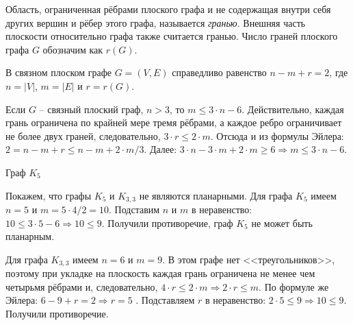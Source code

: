 Область, ограниченная рёбрами плоского графа и не содержащая внутри себя других 
вершин и рёбер этого графа, называется \emph{гранью}. Внешняя часть плоскости 
относительно графа также считается гранью. Число граней плоского графа $G$ 
обозначим как $r(G)$.

\begin{theorem}
	В связном плоском графе $G=(V,E)$ справедливо равенство $n-m+r=2$, где 
	$n=|V|$, $m=|E|$ и $r=r(G)$.
\end{theorem}

Если $G$ – связный плоский граф, $n>3$, то $m \le 3\cdot n-6$. Действительно, 
каждая грань ограничена по крайней мере тремя рёбрами, а каждое ребро 
ограничивает не более двух граней, следовательно, $3 \cdot r \le 2 \cdot m$. 
Отсюда и из формулы Эйлера: $2=n-m+r \le n-m+2 \cdot m/3$. Далее: $3 \cdot n-3 
\cdot m+2 \cdot m \ge 6 \Rightarrow m \le 3 \cdot n-6$.

\begin{floatingfigure}{7cm}
	\center
	\caption{Граф $K_5$}
\end{floatingfigure}

Покажем, что графы $K_5$ и $K_{3,3}$ не являются планарными. Для графа $K_5$ 
имеем $n=5$ и $m=5 \cdot 4/2=10$. Подставим $n$ и $m$ в неравенство: $10 \le 3 
\cdot 5-6 \Rightarrow 10 \le 9$. Получили противоречие, граф $K_5$ не может 
быть планарным.

Для графа $K_{3,3}$ имеем $n=6$ и $m=9$. В этом графе нет <<треугольников>>, 
поэтому при укладке на плоскость каждая грань ограничена не менее чем четырьмя 
рёбрами и, следовательно, $4 \cdot r \le 2 \cdot m \Rightarrow 2 \cdot r \le 
m$. По формуле же Эйлера: $6-9+r=2 \Rightarrow r=5$ . Подставляем $r$ в 
неравенство: $2 \cdot 5 \le 9 \Rightarrow 10 \le 9$. Получили противоречие.

